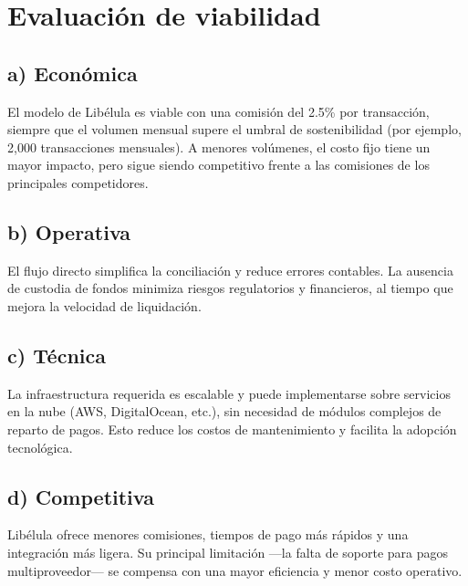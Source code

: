 	\section*{Evaluación de viabilidad}
	\subsection*{a) Económica}
	El modelo de Libélula es viable con una comisión del 2.5\% por transacción, siempre que el volumen mensual supere el umbral de sostenibilidad (por ejemplo, 2,000 transacciones mensuales). A menores volúmenes, el costo fijo tiene un mayor impacto, pero sigue siendo competitivo frente a las comisiones de los principales competidores.
	
	\subsection*{b) Operativa}
	El flujo directo simplifica la conciliación y reduce errores contables. La ausencia de custodia de fondos minimiza riesgos regulatorios y financieros, al tiempo que mejora la velocidad de liquidación.
	
	\subsection*{c) Técnica}
	La infraestructura requerida es escalable y puede implementarse sobre servicios en la nube (AWS, DigitalOcean, etc.), sin necesidad de módulos complejos de reparto de pagos. Esto reduce los costos de mantenimiento y facilita la adopción tecnológica.
	
	\subsection*{d) Competitiva}
	Libélula ofrece menores comisiones, tiempos de pago más rápidos y una integración más ligera. Su principal limitación ---la falta de soporte para pagos multiproveedor--- se compensa con una mayor eficiencia y menor costo operativo.
